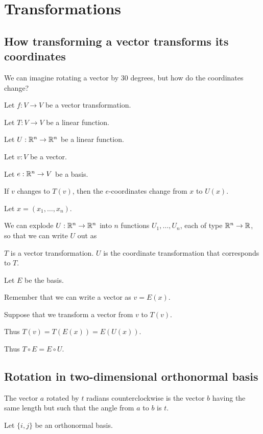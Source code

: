 \chapter{Transformations}

\section{How transforming a vector transforms its coordinates}

We can imagine rotating a vector by 30 degrees,
but how do the coordinates change?

Let \(f : V \to V\) be a vector transformation.

Let \(T : V \to V\) be a linear function.

Let \(U : \mathbb{R}^n \to \mathbb{R}^n\) be a linear function.

Let \(v:V\) be a vector.

Let \(e:\mathbb{R}^n \to V\) be a basis.

If \(v\) changes to \(T(v)\), then the \(e\)-coordinates change from \(x\) to \(U(x)\).

Let \(x = (x_1,\ldots,x_n)\).

We can explode \(U : \mathbb{R}^n \to \mathbb{R}^n\) into \(n\) functions
\(U_1,\ldots,U_n\), each of type \(\mathbb{R}^n \to \mathbb{R}\),
so that we can write \(U\) out as

\(T\) is a vector transformation.
\(U\) is the coordinate transformation that corresponds to \(T\).

Let \(E\) be the basis.

Remember that we can write a vector as \(v = E(x)\).

Suppose that we transform a vector from \(v\) to \(T(v)\).

Thus \(T(v) = T(E(x)) = E(U(x))\).

Thus \(T \circ E = E \circ U\).

\section{Rotation in two-dimensional orthonormal basis}

The vector \(a\) rotated by \(t\) radians counterclockwise is the vector \(b\) having the same length
but such that the angle from \(a\) to \(b\) is \(t\).

Let \(\{i,j\}\) be an orthonormal basis.

